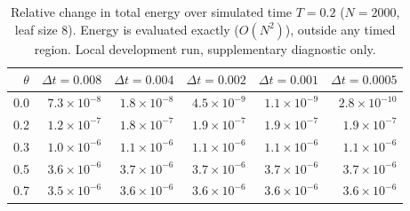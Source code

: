 \begin{table}[t]
\centering\small
\caption{Relative change in total energy over simulated time $T=0.2$ ($N=2000$, leaf size 8). Energy is evaluated exactly ($O(N^2)$), outside any timed region. Local development run, supplementary diagnostic only.}
\label{tab:energy}
\begin{tabular}{rrrrrr}
\hline
$\theta$ & $\Delta t=0.008$ & $\Delta t=0.004$ & $\Delta t=0.002$ & $\Delta t=0.001$ & $\Delta t=0.0005$ \\
\hline
0.0 & $7.3\times10^{-8}$ & $1.8\times10^{-8}$ & $4.5\times10^{-9}$ & $1.1\times10^{-9}$ & $2.8\times10^{-10}$ \\
0.2 & $1.2\times10^{-7}$ & $1.8\times10^{-7}$ & $1.9\times10^{-7}$ & $1.9\times10^{-7}$ & $1.9\times10^{-7}$ \\
0.3 & $1.0\times10^{-6}$ & $1.1\times10^{-6}$ & $1.1\times10^{-6}$ & $1.1\times10^{-6}$ & $1.1\times10^{-6}$ \\
0.5 & $3.6\times10^{-6}$ & $3.7\times10^{-6}$ & $3.7\times10^{-6}$ & $3.7\times10^{-6}$ & $3.7\times10^{-6}$ \\
0.7 & $3.5\times10^{-6}$ & $3.6\times10^{-6}$ & $3.6\times10^{-6}$ & $3.6\times10^{-6}$ & $3.6\times10^{-6}$ \\
\hline
\end{tabular}
\end{table}
